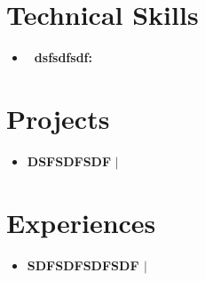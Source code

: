 \documentclass[letterpaper,5pt]{article}
\begin{document}
    
    \section{Technical Skills}
    
        \begin{itemize}[leftmargin=0.15in,label={}]
        \item{
          
            \textbf{\ dsfsdfsdf: } 
            \newline
            \vspace*{-6mm}  
          
        }

        \end{itemize}

        
    
    \section{Projects}
    
        \begin{itemize}[leftmargin=0.15in,label={}]
        
          \item{
            \textbf{DSFSDFSDF} $|$  
            \hfill 
          }
          \begin{itemize}
            \vspace{-5pt}
             
            \vspace{-5pt}
                         
          \end{itemize}
          
          
      \end{itemize}
      \vspace*{-6mm}  
        


    
      
        \section{Experiences}
        \begin{itemize}[leftmargin=0.15in,label={}]
        
            \item[]
            \textbf{SDFSDFSDFSDF $|$ \emph{}}  \hfill 
            \begin{itemize}
              \vspace{-5pt}
               
              \vspace{-5pt}
                           
            \end{itemize}
      \end{itemize}
      
\end{document}
